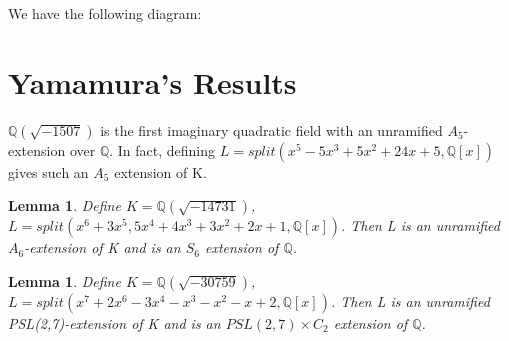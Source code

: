 \documentclass[preprint,12pt,reqno]{elsarticle}
\newtheorem{lemma}[theorem]{Lemma}
\begin{document}
We have the following diagram:
\begin{center}
\end{center}
\section{Yamamura's Results}
\cite{YAM2} $\mathbb{Q}(\sqrt{-1507})$ is the first imaginary quadratic field with an unramified $A_5$-extension over $\mathbb{Q}$. In fact, defining $L=split(x^5-5x^3+5x^2+24x+5,\mathbb{Q}[x])$ gives such an $A_5$ extension of K. 
\begin{lemma}
Define $K=\mathbb{Q}(\sqrt{-14731})$, $L=split(x^6+3x^5,5x^4+4x^3+3x^2+2x+1,\mathbb{Q}[x])$. Then L is an unramified $A_6$-extension of K and is an $S_6$ extension of $\mathbb{Q}$.
\end{lemma}
\begin{lemma}
Define $K=\mathbb{Q}(\sqrt{-30759})$, $L=split(x^7+2x^6-3x^4-x^3-x^2-x+2,\mathbb{Q}[x])$. Then L is an unramified PSL(2,7)-extension of K and is an $PSL(2,7)\times C_2$ extension of $\mathbb{Q}$.
\end{lemma}
\end{document}
